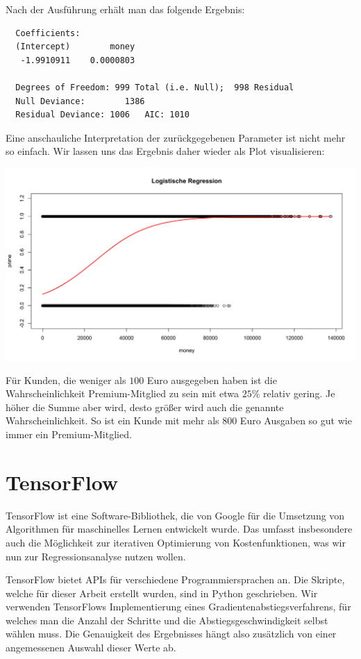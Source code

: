 Nach der Ausführung erhält man das folgende Ergebnis:

\begin{verbatim}
  Coefficients:
  (Intercept)        money
   -1.9910911    0.0000803

  Degrees of Freedom: 999 Total (i.e. Null);  998 Residual
  Null Deviance:	    1386
  Residual Deviance: 1006 	AIC: 1010
\end{verbatim}

Eine anschauliche Interpretation der zurückgegebenen Parameter ist nicht mehr so einfach. Wir lassen uns das Ergebnis daher wieder als Plot visualisieren:

\includegraphics[width=\textwidth]{r-logisticRegression}

Für Kunden, die weniger als $100$ Euro ausgegeben haben ist die Wahrscheinlichkeit Premium-Mitglied zu sein mit etwa $25\%$ relativ gering. Je höher die Summe aber wird, desto größer wird auch die genannte Wahrscheinlichkeit. So ist ein Kunde mit mehr als $800$ Euro Ausgaben so gut wie immer ein Premium-Mitglied.

\section{TensorFlow}
\label{section:3:3}

TensorFlow ist eine Software-Bibliothek, die von Google für die Umsetzung von Algorithmen für maschinelles Lernen entwickelt wurde. Das umfasst insbesondere auch die Möglichkeit zur iterativen Optimierung von Kostenfunktionen, was wir nun zur Regressionsanalyse nutzen wollen.

TensorFlow bietet APIs für verschiedene Programmiersprachen an. Die Skripte, welche für dieser Arbeit erstellt wurden, sind in Python geschrieben. Wir verwenden TensorFlows Implementierung eines Gradientenabstiegsverfahrens, für welches man die Anzahl der Schritte und die Abstiegsgeschwindigkeit selbst wählen muss. Die Genauigkeit des Ergebnisses hängt also zusätzlich von einer angemessenen Auswahl dieser Werte ab.

